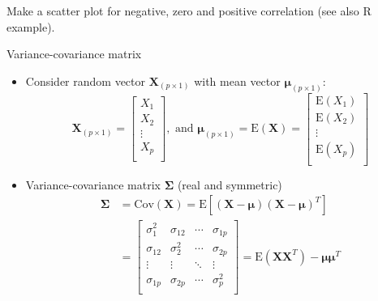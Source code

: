 \documentclass[
  ignorenonframetext,
]{beamer}
\begin{document}
\begin{frame}
Make a scatter plot for negative, zero and positive correlation (see
also R example).

\vspace{6cm}
\end{frame}

\begin{frame}
\begin{block}{Variance-covariance matrix}
\protect\hypertarget{variance-covariance-matrix}{}
\vspace{2mm}

\begin{itemize}
\item
  Consider random vector \(\boldsymbol{X}_{(p\times 1)}\) with mean
  vector \(\boldsymbol{\mu}_{(p\times 1)}\):
  \[\boldsymbol{X}_{(p\times 1)} =\left[ \begin{array}{c} X_1\\ X_2\\ \vdots\\ X_p\\ \end{array} \right], \text{ and }\boldsymbol{\mu}_{(p\times 1)} =\text{E}(\boldsymbol{X})=\left[ \begin{array}{c} \text{E}(X_1)\\ \text{E}(X_2)\\ \vdots\\ \text{E}(X_p)\\ \end{array}\right]\]
\item
  Variance-covariance matrix \(\boldsymbol\Sigma\) (real and symmetric)
  \begin{align*}
  \boldsymbol\Sigma & =\text{Cov}(\boldsymbol{X})  
  =\text{E}[(\boldsymbol{X}-\boldsymbol{\mu})(\boldsymbol{X}-\boldsymbol{\mu})^T] \\
  & = \left[ \begin{array}{cccc} \sigma_{1}^2 & \sigma_{12} & \cdots & \sigma_{1p}\\ \sigma_{12} & \sigma_{2}^2 & \cdots & \sigma_{2p}\\ \vdots & \vdots & \ddots & \vdots\\ \sigma_{1p} & \sigma_{2p} & \cdots & \sigma_{p}^2\\ \end{array}  \right] 
   = \text{E}(\boldsymbol{X}\boldsymbol{X}^T)-\boldsymbol{\mu}\boldsymbol{\mu}^T
  \end{align*}
\end{itemize}
\end{block}
\end{frame}
\end{document}
